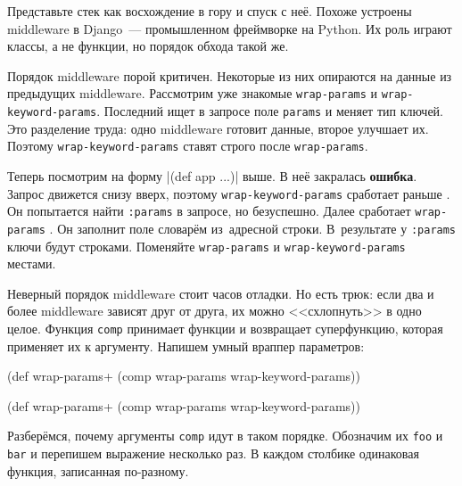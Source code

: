 
Представьте стек как восхождение в гору и спуск с неё. Похоже устроены
middleware в Django~--- промышленном фреймворке на Python. Их роль играют классы, а
не функции, но порядок обхода такой же.

Порядок middleware порой критичен. Некоторые из них опираются на данные из
предыдущих middleware. Рассмотрим уже знакомые \verb|wrap-params| и
\verb|wrap-keyword-params|. Последний ищет в запросе поле \verb|params| и
меняет тип ключей. Это разделение труда: одно middleware готовит данные, второе
улучшает их. Поэтому \verb|wrap-keyword-params| ставят строго после
\verb|wrap-params|.


\mnoindent
Теперь посмотрим на форму \spverb|(def app ...)| выше. В неё закралась
\textbf{ошибка}. Запрос движется снизу вверх, поэтому \verb|wrap-keyword-params|
сработает раньше . Он попытается найти \verb|:params| в запросе, но
безуспешно. Далее сработает \verb|wrap-params| . Он заполнит поле
словарём из~адресной строки. В~результате у \verb|:params| ключи будут
строками. Поменяйте \verb|wrap-params| и \verb|wrap-keyword-params| местами.

Неверный порядок middleware стоит часов отладки. Но есть трюк: если два и более
middleware зависят друг от друга, их можно <<схлопнуть>> в одно целое. Функция
\verb|comp| принимает функции и возвращает суперфункцию, которая применяет их
к аргументу. Напишем умный враппер параметров:


\ifx\DEVICETYPE\MOBILE

\begin{english}
  \begin{clojure}
(def wrap-params+
  (comp wrap-params wrap-keyword-params))
  \end{clojure}
\end{english}

\else

\begin{english}
  \begin{clojure}
(def wrap-params+ (comp wrap-params wrap-keyword-params))
  \end{clojure}
\end{english}

\fi

Разберёмся, почему аргументы \verb|comp| идут в таком порядке. Обозначим
их \verb|foo| и \verb|bar| и перепишем выражение несколько раз. В каждом
столбике одинаковая функция, записанная по-разному.

